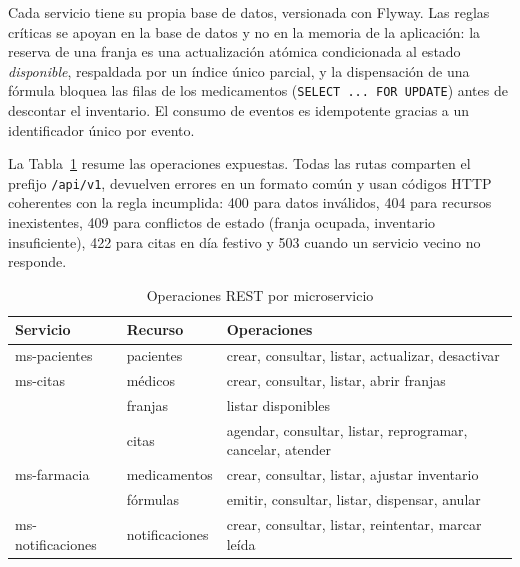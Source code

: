 \documentclass[conference]{IEEEtran}
\begin{document}
Cada servicio tiene su propia base de datos, versionada con Flyway. Las reglas críticas se apoyan en la base de datos y no en la memoria de la aplicación: la reserva de una franja es una actualización atómica condicionada al estado \emph{disponible}, respaldada por un índice único parcial, y la dispensación de una fórmula bloquea las filas de los medicamentos (\texttt{SELECT ... FOR UPDATE}) antes de descontar el inventario. El consumo de eventos es idempotente gracias a un identificador único por evento.

La Tabla~\ref{tab:apis} resume las operaciones expuestas. Todas las rutas comparten el prefijo \texttt{/api/v1}, devuelven errores en un formato común y usan códigos HTTP coherentes con la regla incumplida: 400 para datos inválidos, 404 para recursos inexistentes, 409 para conflictos de estado (franja ocupada, inventario insuficiente), 422 para citas en día festivo y 503 cuando un servicio vecino no responde.

\begin{table}[t]
\caption{Operaciones REST por microservicio}
\label{tab:apis}
\centering
\footnotesize
\begin{tabular}{@{}llp{38mm}@{}}
\toprule
\textbf{Servicio} & \textbf{Recurso} & \textbf{Operaciones} \\
\midrule
ms-pacientes & pacientes & crear, consultar, listar, actualizar, desactivar \\
\midrule
ms-citas & médicos & crear, consultar, listar, abrir franjas \\
 & franjas & listar disponibles \\
 & citas & agendar, consultar, listar, reprogramar, cancelar, atender \\
\midrule
ms-farmacia & medicamentos & crear, consultar, listar, ajustar inventario \\
 & fórmulas & emitir, consultar, listar, dispensar, anular \\
\midrule
ms-notificaciones & notificaciones & crear, consultar, listar, reintentar, marcar leída \\
\bottomrule
\end{tabular}
\end{table}
\end{document}
